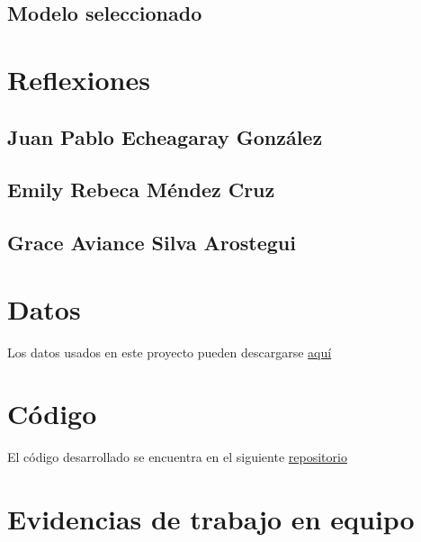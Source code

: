 \documentclass[journal]{IEEEtran}                                                          %
\begin{document}
        \subsection{Modelo seleccionado} \label{selected-model}

    \section{Reflexiones} \label{thoughts}

        \subsection{Juan Pablo Echeagaray González}

        \subsection{Emily Rebeca Méndez Cruz}

        \subsection{Grace Aviance Silva Arostegui}


    \appendices
    
    \section{Datos} \label{data}

        Los datos usados en este proyecto pueden descargarse \href{https://www.kaggle.com/code/ravaliraj/risk-classification-of-cervical-cancer}{aquí}

    \section{Código}

        El código desarrollado se encuentra en el siguiente \href{https://github.com/JuanEcheagaray75/cancer-clf}{repositorio}
    \section{Evidencias de trabajo en equipo}

    
    
\end{document}
